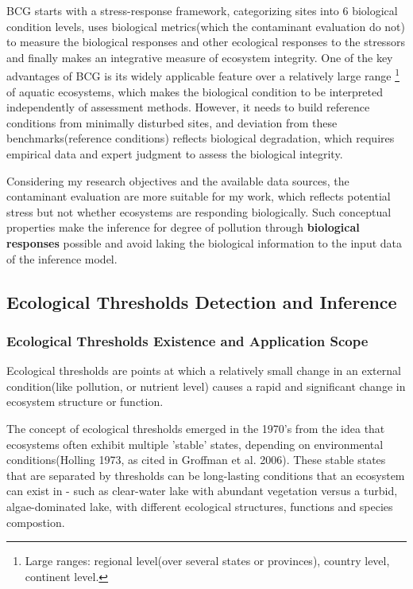 BCG starts with a stress-response framework, categorizing sites into 6 biological condition levels,
uses biological metrics(which the contaminant evaluation do not) to measure the biological responses 
and other ecological responses to the stressors and finally makes an integrative measure of 
ecosystem integrity.
One of the key advantages of BCG is its widely applicable feature over a relatively large range
\footnote{Large ranges: regional level(over several states or provinces), country level, continent level.}
of aquatic ecosystems, which makes the biological condition to be interpreted independently of 
assessment methods\cite{Davies2006}. However, it needs to build reference conditions from minimally disturbed sites,
and deviation from these benchmarks(reference conditions) reflects biological degradation,
which requires empirical data and expert judgment to assess the biological integrity.

Considering my research objectives and the available data sources, 
the contaminant evaluation are more suitable for my work, which reflects potential stress but not 
whether ecosystems are responding biologically. Such conceptual properties make the inference 
for degree of pollution through \textbf{biological responses} possible and avoid laking the 
biological information to the input data of the inference model.

\subsection{Ecological Thresholds Detection and Inference}

\subsubsection{Ecological Thresholds Existence and Application Scope}


Ecological thresholds are points at which a relatively small change in an 
external condition(like pollution, or nutrient level) causes a rapid and 
significant change in ecosystem structure or function.

The concept of ecological thresholds emerged in the 1970's from the idea that 
ecosystems often exhibit multiple 'stable' states, depending on environmental conditions\cite{Holling1973}(Holling 1973, as cited in Groffman et al. 2006).
These stable states that are separated by thresholds can be long-lasting conditions 
that an ecosystem can exist in - such as clear-water lake with abundant vegetation versus 
a turbid, algae-dominated lake, with different ecological structures, functions and species compostion.

